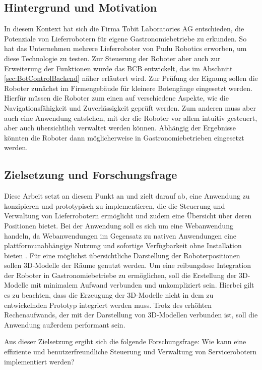 \subsection{Hintergrund und Motivation}\label{sec:BackgroundAndMotivation}
In diesem Kontext hat sich die Firma Tobit Laboratories AG entschieden, die Potenziale von Lieferrobotern für eigene Gastronomiebetriebe zu erkunden. So hat das Unternehmen mehrere Lieferroboter von Pudu Robotics erworben, um diese Technologie zu testen. Zur Steuerung der Roboter aber auch zur Erweiterung der Funktionen wurde das \ac{BCB} entwickelt, das im Abschnitt \ref{sec:BotControlBackend} näher erläutert wird. Zur Prüfung der Eignung sollen die Roboter zunächst im Firmengebäude für kleinere Botengänge eingesetzt werden. Hierfür müssen die Roboter zum einen auf verschiedene Aspekte, wie die Navigationsfähigkeit und Zuverlässigkeit geprüft werden. Zum anderen muss aber auch eine Anwendung entstehen, mit der die Roboter vor allem intuitiv gesteuert, aber auch übersichtlich verwaltet werden können. Abhängig der Ergebnisse könnten die Roboter dann möglicherweise in Gastronomiebetrieben eingesetzt werden.

\subsection{Zielsetzung und Forschungsfrage}\label{sec:ResearchQuestion}
Diese Arbeit setzt an diesem Punkt an und zielt darauf ab, eine Anwendung zu konzipieren und prototypisch zu implementieren, die die Steuerung und Verwaltung von Lieferrobotern ermöglicht und zudem eine Übersicht über deren Positionen bietet. Bei der Anwendung soll es sich um eine Webanwendung handeln, da Webanwendungen im Gegensatz zu nativen Anwendungen eine plattformunabhängige Nutzung und sofortige Verfügbarkeit ohne Installation bieten \cite{AWSWebApp}. Für eine möglichst übersichtliche Darstellung der Roboterpositionen sollen 3D-Modelle der Räume genutzt werden. Um eine reibungslose Integration der Roboter in Gastronomiebetriebe zu ermöglichen, soll die Erstellung der 3D-Modelle mit minimalem Aufwand verbunden und unkompliziert sein. Hierbei gilt es zu beachten, dass die Erzeugung der 3D-Modelle nicht in dem zu entwickelnden Prototyp integriert werden muss. Trotz des erhöhten Rechenaufwands, der mit der Darstellung von 3D-Modellen verbunden ist, soll die Anwendung außerdem performant sein.

Aus dieser Zielsetzung ergibt sich die folgende Forschungsfrage: Wie kann eine effiziente und benutzerfreundliche Steuerung und Verwaltung von Servicerobotern implementiert werden?

